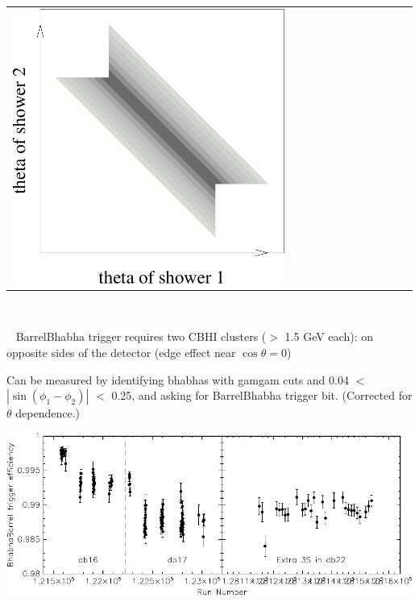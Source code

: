 \documentclass[landscape]{article}
\newenvironment{slide}{\mbox{ }\vfill}{\vfill \mbox{ } \pagebreak}
\begin{document}
\begin{slide}
\begin{tabular}{p{0.7\linewidth} p{0.3\linewidth}}
\begin{minipage}{\linewidth}
      \includegraphics[width=\linewidth]{explain_asymmetric_cut.pdf}
    \end{minipage}
  \end{tabular}
\end{slide}

\begin{slide}
  \vfill BarrelBhabha trigger requires two CBHI clusters ($>$ 1.5 GeV
  each): on opposite sides of the detector (edge effect near
  $\cos\theta = 0$)

  \vfill Can be measured by identifying bhabhas with gamgam cuts and
  0.04 $<$ $|\sin(\phi_1 - \phi_2)|$ $<$ 0.25, and asking for
  BarrelBhabha trigger bit.  (Corrected for $\theta$ dependence.)

  \vfill \begin{center}
    \includegraphics[width=\linewidth]{prepforpta2.pdf}
  \end{center}
\end{slide}
\end{document}
